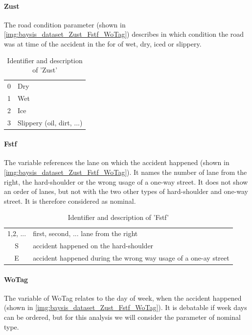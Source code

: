 \paragraph{Zust}
The road condition parameter (shown in \autoref{img:baysis_dataset_Zust_Fstf_WoTag}) describes in which condition the road was at time of the accident in the for of wet, dry, iced or slippery.
\noindent
\begin{table}[ht]
	\centering
	\begin{tabular}{c|l}  
		0 & Dry \\ 
 		1 & Wet \\ 
 		2 & Ice \\
 		3 & Slippery (oil, dirt, ...)  \\
	\end{tabular}
	\caption{Identifier and description of 'Zust'}
	\label{table:baysis_dataset_Zust}
\end{table}

\paragraph{Fstf}
The variable references the lane on which the accident happened (shown in \autoref{img:baysis_dataset_Zust_Fstf_WoTag}). It names the number of lane from the right, the hard-shoulder or the wrong usage of a one-way street. It does not show an order of lanes, but not with the two other types of hard-shoulder and one-way street. It is therefore considered as nominal.
\noindent
\begin{table}[ht]
	\centering
	\begin{tabular}{c|l}  
		1,2, ... & first, second, ... lane from the right \\ 
 		S & accident happened on the hard-shoulder \\ 
 		E & accident happened during the wrong way usage of a one-ay street \\
	\end{tabular}
	\caption{Identifier and description of 'Fstf'}
	\label{table:baysis_dataset_Fstf}
\end{table}
    
\paragraph{WoTag}
The variable of WoTag relates to the day of week, when the accident happened (shown in \autoref{img:baysis_dataset_Zust_Fstf_WoTag}). It is debatable if week days can be ordered, but for this analysis we will consider the parameter of nominal type.

